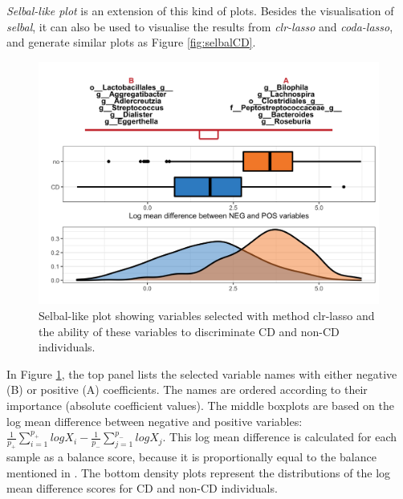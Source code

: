 \documentclass[openany]{book}
\newenvironment{Shaded}{\begin{snugshade}}{\end{snugshade}}
\newcommand{\KeywordTok}[1]{\textcolor[rgb]{0.13,0.29,0.53}{\textbf{#1}}}
\newcommand{\DataTypeTok}[1]{\textcolor[rgb]{0.13,0.29,0.53}{#1}}
\newcommand{\StringTok}[1]{\textcolor[rgb]{0.31,0.60,0.02}{#1}}
\newcommand{\CommentTok}[1]{\textcolor[rgb]{0.56,0.35,0.01}{\textit{#1}}}
\newcommand{\OperatorTok}[1]{\textcolor[rgb]{0.81,0.36,0.00}{\textbf{#1}}}
\newcommand{\NormalTok}[1]{#1}
\begin{document}
\emph{Selbal-like plot} is an extension of this kind of plots. Besides
the visualisation of \emph{selbal}, it can also be used to visualise the
results from \emph{clr-lasso} and \emph{coda-lasso}, and generate
similar plots as Figure \ref{fig:selbalCD}.

\begin{Shaded}
\end{Shaded}

\begin{figure}

{\centering \includegraphics[width=1\linewidth]{./Generated_plots/clrCD-1} 

}

\caption{Selbal-like plot showing variables selected with method clr-lasso and the ability of these variables to discriminate CD and non-CD individuals.}\label{fig:clrCD}
\end{figure}

In Figure \ref{fig:clrCD}, the top panel lists the selected variable
names with either negative (B) or positive (A) coefficients. The names
are ordered according to their importance (absolute coefficient values).
The middle boxplots are based on the log mean difference between
negative and positive variables:
\(\frac{1}{p_{+}}\sum_{i=1}^{p_{+}}logX_{i} - \frac{1}{p_{-}}\sum_{j=1}^{p_{-}}logX_{j}\).
This log mean difference is calculated for each sample as a balance
score, because it is proportionally equal to the balance mentioned in
\citep{rivera2018balances}. The bottom density plots represent the
distributions of the log mean difference scores for CD and non-CD
individuals.
\end{document}
